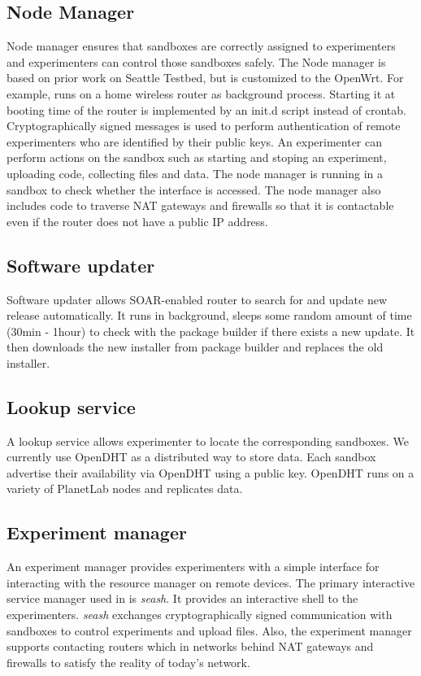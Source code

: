 \subsection{Node Manager}
\label{sec.nodemanager}
Node manager\cite{nodemanager} ensures that sandboxes are correctly assigned to experimenters and experimenters can control those sandboxes safely. The Node manager is based on prior work on Seattle Testbed, but is customized to the OpenWrt. For example, \sysname runs on a home wireless router as background process. Starting it at booting time of the router is implemented by an init.d script instead of crontab. Cryptographically signed messages is used to perform authentication of remote experimenters who are identified by their public keys. An experimenter can perform actions on the sandbox such as starting and stoping an experiment, uploading code, collecting files and data. The node manager is running in a sandbox to check whether the interface is accessed. The node manager also includes code to traverse NAT gateways and firewalls so that it is contactable even if the router does not have a public IP address. 

\subsection{Software updater}
\label{sec.softwareupdater}
Software updater allows SOAR-enabled router to search for and update new release automatically. It runs in background, sleeps some random amount of time (30min - 1hour) to check with the package builder if there exists a new update. It then downloads the new installer from package builder and replaces the old installer. 

\subsection{Lookup service}
\label{sec.lookupservice}
A lookup service allows experimenter to locate the corresponding sandboxes. We currently use OpenDHT\cite{rhea2005opendht} as a distributed way to store data. Each sandbox advertise their availability via OpenDHT using a public key. OpenDHT runs on a variety of PlanetLab nodes and replicates data.

\subsection{Experiment manager}
\label{sec.seash}
An experiment manager provides experimenters with a simple interface for interacting with the resource manager on remote devices. The primary interactive service manager used in \sysname is \textit{seash}\cite{seash}. It provides an interactive shell to the experimenters. \textit{seash} exchanges cryptographically signed communication with sandboxes to control experiments and upload files. Also, the experiment manager supports contacting routers which in networks behind NAT gateways and firewalls to satisfy the reality of today's network.


